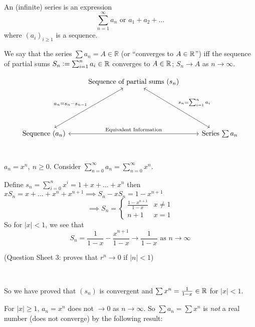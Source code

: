 \setcounter{lecture}{2}

\pagebreak

~

\begin{definition}
An (infinite) series is an expression \[\displaystyle{\sum_{n=1}^{\infty} a_n} \text{ or } a_1  + a_2 + \dots \] where $(a_i)_{i\geq 1}$ is a sequence.
\end{definition}


\begin{definition}
We say that the series $\sum a_n = A \in \mathbb{R}$ (or ``converges to $A \in \mathbb{R}$'') iff the sequence of partial sums $S_n:= \sum_{i=1}^n a_i \in \mathbb{R}$ converges to $A \in \mathbb{R}$; $S_n \to A$ as $n \to \infty$. 
\end{definition}



\[
\begin{tikzcd}[row sep=2cm]
 &  \mbox{Sequence of partial sums $(s_n)$}\arrow[<->]{dr}{s_n = \sum_{i=1}^n a_i} \\ 
\mbox{Sequence $(a_n)$} \arrow[<->]{ur}{a_n = s_n - s_{n-1}} \arrow[<->]{rr}{\text{Equivalent Information}} && \mbox{Series $\sum a_n$}
\end{tikzcd}
\]~\\



\begin{example}
$a_n = x^n,~n \geq 0$. Consider $\sum_{n=0}^{\infty} a_n = \sum_{n=0}^{\infty} x^n$.

Define $s_n = \sum_{i=0}^n x^i = 1 + x + \dots + x^n$ then $xS_n = x + \dots + x^n + x^{n+1} \implies S_n - xS_n = 1 - x^{n+1}$
\[\implies S_n = \begin{cases}
 \frac{1-x^{n+1}}{1-x} & x \neq 1\\
 n+1 & x = 1	
 \end{cases}
\]
So for $|x| < 1$, we see that 
\[S_n = \frac{1}{1-x} - \frac{x^{n+1}}{1-x} \to \frac{1}{1-x} \text{ as } n \to \infty\]

(Question Sheet 3: proves that $r^n \to 0$ if $|n| < 1$)
\end{example}~

So we have proved that $(s_n)$ is convergent and $\sum x^n = \frac{1}{1-x} \in\mathbb{R}$ for $|x| < 1$. 

For $|x| \geq 1$, $a_n = x^n$ does not $\to 0$ as $n \to \infty$. So $\sum a_n = \sum x^n$ is \emph{not} a real number (does not converge) by the following result:\\


